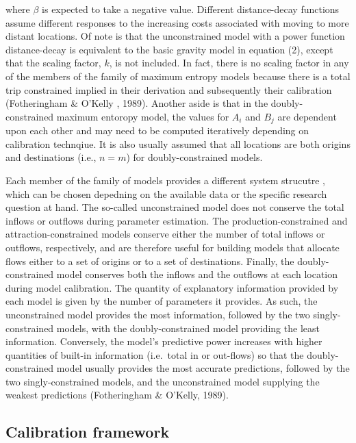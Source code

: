 \documentclass[11pt]{article}
\begin{document}
where \(\beta\) is expected to take a negative value. Different
distance-decay functions assume different responses to the increasing
costs associated with moving to more distant locations. Of note is that
the unconstrained model with a power function distance-decay is
equivalent to the basic gravity model in equation (2), except that the
scaling factor, \(k\), is not included. In fact, there is no scaling
factor in any of the members of the family of maximum entropy models
because there is a total trip constrained implied in their derivation
and subsequently their calibration (Fotheringham \& O'Kelly , 1989).
Another aside is that in the doubly-constrained maximum entoropy model,
the values for \(A_{i}\) and \(B_{j}\) are dependent upon each other and
may need to be computed iteratively depending on calibration technqiue.
It is also usually assumed that all locations are both origins and
destinations (i.e., \(n=m\)) for doubly-constrained models.

Each member of the family of models provides a different system
strucutre , which can be chosen depedning on the available data or the
specific research question at hand. The so-called unconstrained model
does not conserve the total inflows or outflows during parameter
estimation. The production-constrained and attraction-constrained models
conserve either the number of total inflows or outflows, respectively,
and are therefore useful for building models that allocate flows either
to a set of origins or to a set of destinations. Finally, the
doubly-constrained model conserves both the inflows and the outflows at
each location during model calibration. The quantity of explanatory
information provided by each model is given by the number of parameters
it provides. As such, the unconstrained model provides the most
information, followed by the two singly-constrained models, with the
doubly-constrained model providing the least information. Conversely,
the model's predictive power increases with higher quantities of
built-in information (i.e.~total in or out-flows) so that the
doubly-constrained model usually provides the most accurate predictions,
followed by the two singly-constrained models, and the unconstrained
model supplying the weakest predictions (Fotheringham \& O'Kelly, 1989).

    \subsection{Calibration framework}\label{calibration-framework}
\end{document}
